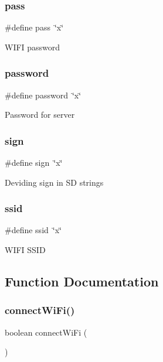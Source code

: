 \subsubsection{\texorpdfstring{pass}{pass}}
{\footnotesize\ttfamily \#define pass~\char`\"{}x\char`\"{}}

W\+I\+FI password \mbox{\label{_w_s_8ino_ae59dfb8ffddb9128834034516c45e7ce}} 
\subsubsection{\texorpdfstring{password}{password}}
{\footnotesize\ttfamily \#define password~\char`\"{}x\char`\"{}}

Password for server \mbox{\label{_w_s_8ino_a9d8dc79272f5859f2c509c88f073dbde}} 
\subsubsection{\texorpdfstring{sign}{sign}}
{\footnotesize\ttfamily \#define sign~\char`\"{}x\char`\"{}}

Deviding sign in SD strings \mbox{\label{_w_s_8ino_abd15b8fcd3b82c2827693b9fd882a206}} 
\subsubsection{\texorpdfstring{ssid}{ssid}}
{\footnotesize\ttfamily \#define ssid~\char`\"{}x\char`\"{}}

W\+I\+FI S\+S\+ID 

\subsection{Function Documentation}
\mbox{\label{_w_s_8ino_a144025702d7aa7708d704324ecb09eff}} 
\subsubsection{\texorpdfstring{connect\+Wi\+Fi()}{connectWiFi()}}
{\footnotesize\ttfamily boolean connect\+Wi\+Fi (\begin{DoxyParamCaption}{ }\end{DoxyParamCaption})}




